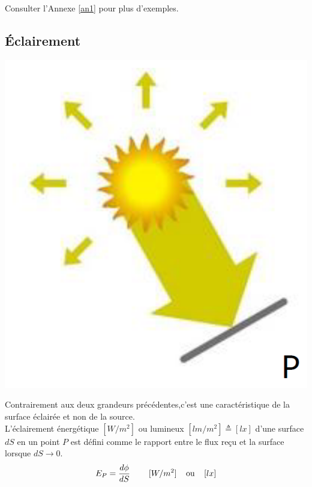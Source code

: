 \documentclass[11pt]{report}
\begin{document}
Consulter l'Annexe \ref{an1} pour plus d'exemples.


%



\subsection{Éclairement}
\begin{minipage}{0.2\linewidth}
\centering
\includegraphics[scale=0.2]{eclair}
\end{minipage}
\begin{minipage}{0.75\linewidth}
Contrairement aux deux grandeurs précédentes,c'est une caractéristique de la surface éclairée et non de la source.\\ L'éclairement énergétique $[W/m^2]$ ou lumineux $[lm/m^2]\triangleq[lx]$ d'une surface $dS$ en un point $P$ est défini comme le rapport entre le flux reçu et la surface lorsque $dS \longrightarrow 0$.
$$E_P = \frac{d\phi}{dS}\;\;\;\;\;\;\;\; [W/m^2]\;\;\;\;\textup{ou} \;\;\;\; [lx]$$
\end{minipage}
\end{document}
